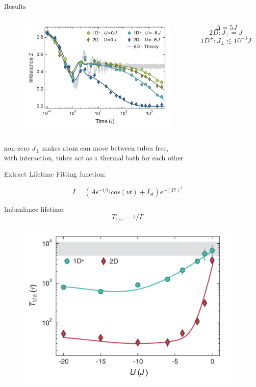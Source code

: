 \documentclass{beamer}
\begin{document}
\begin{frame}{Results}
\begin{columns}
\begin{figure}
\includegraphics[width=1\linewidth]{coupling2}
\end{figure}
$$\Delta = 5J$$
$$2D:J_{\perp}=J$$
$$1D^{+}:J_{\perp}\lesssim 10^{-3} J$$
\end{columns}
\begin{center}
\small{non-zero $J_{\perp}$ makes atom can move between tubes free,}\\
\small{with interaction, tubes act as a thermal bath for each other}
\end{center}
\end{frame}

\begin{frame}{Extract Lifetime}
Fitting function:

$$I=(Ae^{-t/t_1}cos(\nu t)+I_{st})e^{-(\Gamma t)^\beta}$$

Imbanlance lifetime:
$$T_{1/e} = 1/\Gamma$$
\begin{figure}
\includegraphics[width=0.5\linewidth]{lifetime}
\end{figure}
\end{frame}
\end{document}
